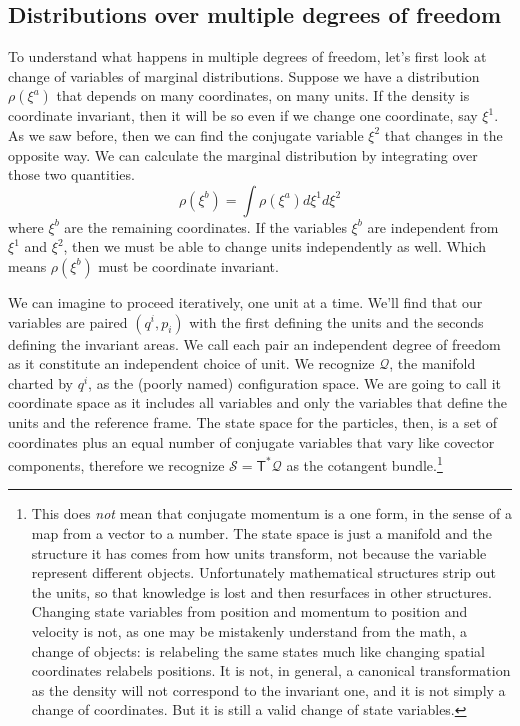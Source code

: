 \documentclass[11pt]{article}
\begin{document}
\subsection*{Distributions over multiple degrees of freedom}

To understand what happens in multiple degrees of freedom, let's first look at change of variables of marginal distributions. Suppose we have a distribution $\rho(\xi^a)$ that depends on many coordinates, on many units. If the density is coordinate invariant, then it will be so even if we change one coordinate, say $\xi^1$. As we saw before, then we can find the conjugate variable $\xi^2$ that changes in the opposite way. We can calculate the marginal distribution by integrating over those two quantities.
\begin{equation}
\rho(\xi^b) = \int \rho(\xi^a) d\xi^1 d\xi^2
\end{equation}
where $\xi^b$ are the remaining coordinates. If the variables $\xi^b$ are independent from $\xi^1$ and $\xi^2$, then we must be able to change units independently as well. Which means $\rho(\xi^b)$ must be coordinate invariant.

We can imagine to proceed iteratively, one unit at a time. We'll find that our variables are paired $(q^i, p_i)$  with the first defining the units and the seconds defining the invariant areas. We call each pair an independent degree of freedom as it constitute an independent choice of unit. We recognize $\mathcal{Q}$, the manifold charted by $q^i$, as the (poorly named) configuration space. We are going to call it coordinate space as it includes all variables and only the variables that define the units and the reference frame. The state space for the particles, then, is a set of coordinates plus an equal number of conjugate variables that vary like covector components, therefore we recognize $\mathcal{S}=\mathsf{T}^*\mathcal{Q}$ as the cotangent bundle.\footnote{This does \emph{not} mean that conjugate momentum is a one form, in the sense of a map from a vector to a number. The state space is just a manifold and the structure it has comes from how units transform, not because the variable represent different objects. Unfortunately mathematical structures strip out the units, so that knowledge is lost and then resurfaces in other structures. Changing state variables from position and momentum to position and velocity is not, as one may be mistakenly understand from the math, a change of objects: is relabeling the same states much like changing spatial coordinates relabels positions. It is not, in general, a canonical transformation as the density will not correspond to the invariant one, and it is not simply a change of coordinates. But it is still a valid change of state variables.}
\end{document}
